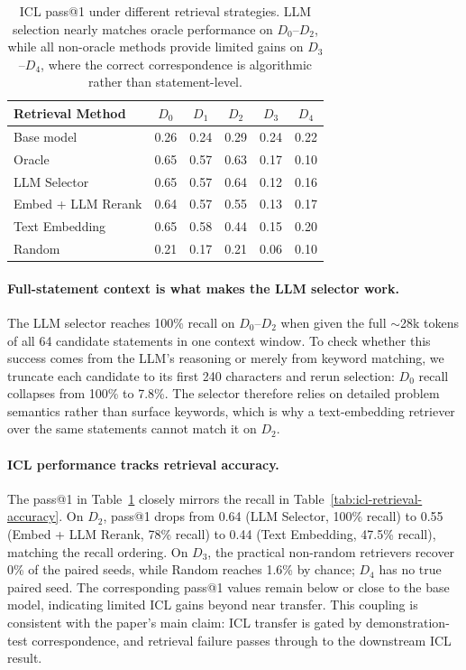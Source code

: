 \documentclass[]{bytedance_seed}
\theoremstyle{plain}
\theoremstyle{definition}
\theoremstyle{remark}
\begin{document}
\begin{table}[h]
\centering
\small
\caption{ICL pass@1 under different retrieval strategies. LLM selection nearly matches oracle performance on $D_0$--$D_2$, while all non-oracle methods provide limited gains on $D_3$--$D_4$, where the correct correspondence is algorithmic rather than statement-level.}
\label{tab:icl-retrieval-performance}
\begin{tabular}{lccccc}
\toprule
\textbf{Retrieval Method} & \textbf{$D_0$} & \textbf{$D_1$} & \textbf{$D_2$} & \textbf{$D_3$} & \textbf{$D_4$} \\
\midrule
Base model & 0.26 & 0.24 & 0.29 & 0.24 & 0.22 \\
Oracle & 0.65 & 0.57 & 0.63 & 0.17 & 0.10 \\
LLM Selector & 0.65 & 0.57 & 0.64 & 0.12 & 0.16 \\
Embed + LLM Rerank & 0.64 & 0.57 & 0.55 & 0.13 & 0.17 \\
Text Embedding & 0.65 & 0.58 & 0.44 & 0.15 & 0.20 \\
Random & 0.21 & 0.17 & 0.21 & 0.06 & 0.10 \\
\bottomrule
\end{tabular}
\end{table}

\paragraph{Full-statement context is what makes the LLM selector work.}
The LLM selector reaches 100\% recall on $D_0$--$D_2$ when given the full $\sim$28k tokens of all 64 candidate statements in one context window. To check whether this success comes from the LLM's reasoning or merely from keyword matching, we truncate each candidate to its first 240 characters and rerun selection: $D_0$ recall collapses from 100\% to 7.8\%. The selector therefore relies on detailed problem semantics rather than surface keywords, which is why a text-embedding retriever over the same statements cannot match it on $D_2$.

\paragraph{ICL performance tracks retrieval accuracy.}
The pass@1 in Table~\ref{tab:icl-retrieval-performance} closely mirrors the recall in Table~\ref{tab:icl-retrieval-accuracy}. On $D_2$, pass@1 drops from 0.64 (LLM Selector, 100\% recall) to 0.55 (Embed + LLM Rerank, 78\% recall) to 0.44 (Text Embedding, 47.5\% recall), matching the recall ordering. On $D_3$, the practical non-random retrievers recover 0\% of the paired seeds, while Random reaches 1.6\% by chance; $D_4$ has no true paired seed. The corresponding pass@1 values remain below or close to the base model, indicating limited ICL gains beyond near transfer. This coupling is consistent with the paper's main claim: ICL transfer is gated by demonstration-test correspondence, and retrieval failure passes through to the downstream ICL result.
\end{document}
